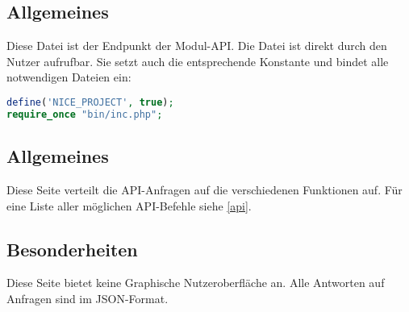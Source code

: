\subsection{Allgemeines} Diese Datei ist der Endpunkt der Modul-API.
Die Datei ist direkt durch den Nutzer aufrufbar. Sie setzt auch die entsprechende Konstante und bindet alle notwendigen Dateien ein:
\begin{lstlisting}[language=php]
define('NICE_PROJECT', true);
require_once "bin/inc.php";
\end{lstlisting}
\subsection{Allgemeines}
Diese Seite verteilt die API-Anfragen auf die verschiedenen Funktionen auf. Für eine Liste aller möglichen API-Befehle siehe \autoref{api}.
\subsection{Besonderheiten}
Diese Seite bietet keine Graphische Nutzeroberfläche an. Alle Antworten auf Anfragen sind im JSON-Format.
